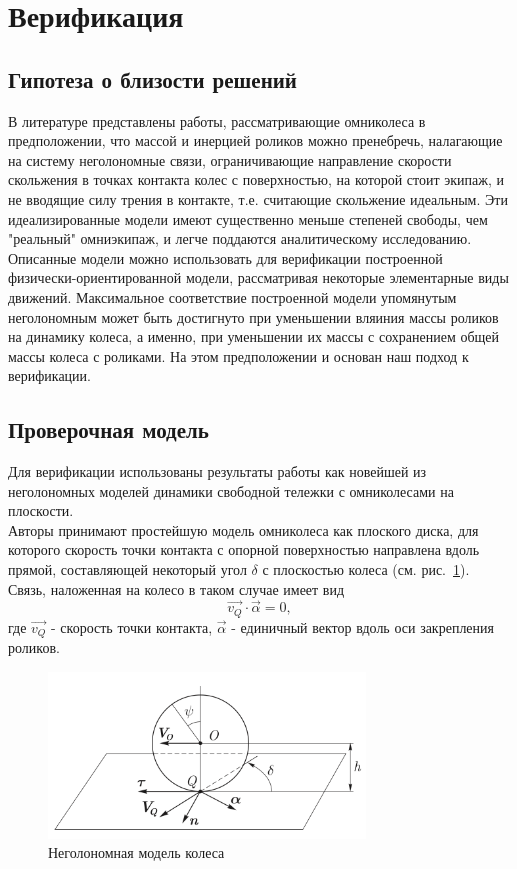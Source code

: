 \documentclass[12pt]{article}
\begin{document}
\section{Верификация}
\subsection{Гипотеза о близости решений}
В литературе представлены \cite{borisov, formalskii, kos4} работы, рассматривающие омниколеса в предположении, что массой и инерцией роликов можно пренебречь, налагающие на систему неголономные связи, ограничивающие направление скорости скольжения в точках контакта колес с поверхностью, на которой стоит экипаж, и не вводящие силу трения в контакте, т.е. считающие скольжение идеальным. Эти идеализированные модели имеют существенно меньше степеней свободы, чем "реальный" омниэкипаж, и легче поддаются аналитическому исследованию.\\

Описанные модели можно использовать для верификации построенной физически-ориентированной модели, рассматривая некоторые элементарные виды движений. Максимальное соответствие построенной модели упомянутым неголономным может быть достигнуто при уменьшении вляиния массы роликов на динамику колеса, а именно, при уменьшении их массы с сохранением общей массы колеса с роликами. На этом предположении и основан наш подход к верификации.\\

\subsection{Проверочная модель}

Для верификации использованы результаты работы \cite{borisov} как новейшей из неголономных моделей динамики свободной тележки с омниколесами на плоскости.\\

Авторы \cite{borisov} принимают простейшую модель омниколеса как плоского диска, для которого скорость точки контакта с опорной поверхностью направлена вдоль прямой, составляющей некоторый угол $\delta$ с плоскостью колеса (см. рис.~\ref{fig:bor_wheel_scheme}). Связь, наложенная на колесо в таком случае имеет вид
$$\vec{v_Q}\cdot\vec{\alpha} = 0,$$
где $\vec{v_Q}$ - скорость точки контакта, $\vec{\alpha}$ - единичный вектор вдоль оси закрепления роликов.\\

\begin{figure}[h!]
    \centering
    \includegraphics[width=0.75\textwidth]{img/art/bor_wheel_scheme.png}
    \caption{Неголономная модель колеса}
    \label{fig:bor_wheel_scheme}
\end{figure}
\end{document}

